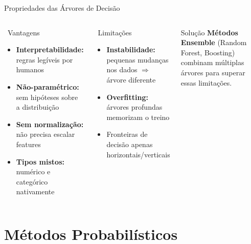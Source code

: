 \documentclass[aspectratio=169]{beamer}
\begin{document}
\begin{frame}{Propriedades das Árvores de Decisão}
\begin{columns}[T]
\begin{block}{\faThumbsUp\ Vantagens}
\begin{itemize}
  \item \textbf{Interpretabilidade:} regras legíveis por humanos
  \item \textbf{Não-paramétrico:} sem hipóteses sobre a distribuição
  \item \textbf{Sem normalização:} não precisa escalar features
  \item \textbf{Tipos mistos:} numérico e categórico nativamente
\end{itemize}
\end{block}
\begin{alertblock}{\faWarning\ Limitações}
\begin{itemize}
  \item \textbf{Instabilidade:} pequenas mudanças nos dados $\Rightarrow$ árvore diferente
  \item \textbf{Overfitting:} árvores profundas memorizam o treino
  \item Fronteiras de decisão apenas horizontais/verticais
\end{itemize}
\end{alertblock}
\vspace{0.4em}
\begin{exampleblock}{Solução}
  \textbf{Métodos Ensemble} (Random Forest, Boosting) combinam múltiplas árvores para superar essas limitações.
\end{exampleblock}
\end{columns}
\end{frame}

\section{Métodos Probabilísticos}
\end{document}
